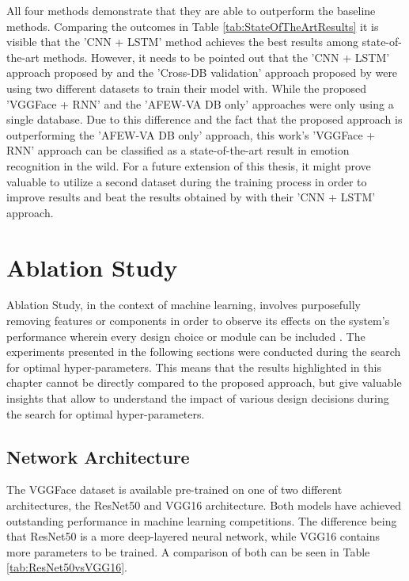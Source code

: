 \noindent All four methods demonstrate that they are able to outperform the baseline methods. Comparing the outcomes in Table \ref{tab:StateOfTheArtResults} it is visible that the 'CNN + LSTM' method achieves the best results among state-of-the-art methods. 
\newline\newline
However, it needs to be pointed out that the 'CNN + LSTM' approach proposed by \citet{Theagarajan:2018:DeepDriver} and the 'Cross-DB validation' approach proposed by \citet{Handrich:2020:SimultaneousPredVA} were using two different datasets to train their model with. While the proposed 'VGGFace + RNN' and the 'AFEW-VA DB only' approaches were only using a single database. Due to this difference and the fact that the proposed approach is outperforming the 'AFEW-VA DB only' approach, this work's 'VGGFace + RNN' approach can be classified as a state-of-the-art result in emotion recognition in the wild.
\newline\newline
For a future extension of this thesis, it might prove valuable to utilize a second dataset during the training process in order to improve results and beat the results obtained by \citet{Theagarajan:2018:DeepDriver} with their 'CNN + LSTM' approach.


\section{Ablation Study}
Ablation Study, in the context of machine learning, involves purposefully removing features or components in order to observe its effects on the system's performance wherein every design choice or module can be included \citep{Lillian:2018:AblationOfARobotsBrain}.
\newline\newline
The experiments presented in the following sections were conducted during the search for optimal hyper-parameters. This means that the results highlighted in this chapter cannot be directly compared to the proposed approach, but give valuable insights that allow to understand the impact of various design decisions during the search for optimal hyper-parameters.

\subsection{Network Architecture}
The VGGFace dataset is available pre-trained on one of two different architectures, the ResNet50 and VGG16 architecture. Both models have achieved outstanding performance in machine learning competitions. The difference being that ResNet50 is a more deep-layered neural network, while VGG16 contains more parameters to be trained. A comparison of both can be seen in Table \ref{tab:ResNet50vsVGG16}.

